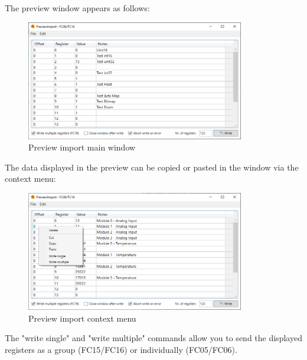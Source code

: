 \newpage
The preview window appears as follows:

\begin{figure}[H]
\centering
\includegraphics[width=0.85\textwidth]{../Img/PreviewImport_Main.PNG}
\caption{Preview import main window}
\end{figure}

The data displayed in the preview can be copied or pasted
in the window via the context menu:

\begin{figure}[H]
\centering
\includegraphics[width=0.85\textwidth]{../Img/PreviewImport_ContextMenu.PNG}
\caption{Preview import context menu}
\end{figure}

The "write single" and "write multiple" commands allow you to send
the displayed registers as a group (FC15/FC16) or individually (FC05/FC06).




